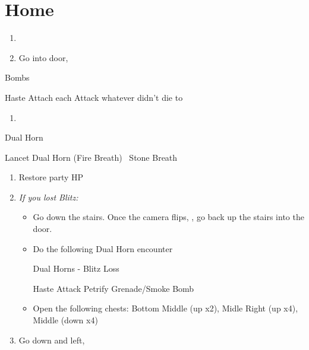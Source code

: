 \chapter{Home}

\begin{enumerate}
  \item \formation{\tidus}{\auron}{\lulu}
  \item Go into door, \sd
\end{enumerate}
\begin{battle}{Bombs}
  \begin{itemize}
    \tidusf Haste \tidus
    \tidusf Attach each
    \auronf Attack whatever didn't die to \tidus
  \end{itemize}
\end{battle}
\begin{enumerate}[resume]
  \item \sd
\end{enumerate}
\begin{battle}{Dual Horn}
  \begin{itemize}
    \kimahrif Lancet Dual Horn (Fire Breath)
    \kimahrif \od\ Stone Breath
  \end{itemize}
\end{battle}
\begin{enumerate}[resume]
  \item Restore party HP
  \item \textit{If you lost Blitz:}
        \begin{itemize}
          \item Go down the stairs. Once the camera flips, \formation{\tidus}{\auron}{\rikku}, go back up the stairs into the door.
          \item Do the following Dual Horn encounter

                \begin{battle}{Dual Horns - Blitz Loss}
                  \begin{itemize}
                    \tidusf Haste \tidus
                    \tidusf Attack
                    \rikkuf Petrify Grenade/Smoke Bomb
                  \end{itemize}
                \end{battle}
          \item Open the following chests: Bottom Middle (up x2), Midle Right (up x4), Middle (down x4) %
        \end{itemize}
  \item Go down and left, \cs[0:50]
\end{enumerate}
